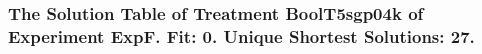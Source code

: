 \begin{frame}
 \fontsize{8pt}{9pt}\selectfont
 \frametitle{ The Solution Table of Treatment BoolT5sgp04k of Experiment ExpF. Fit: 0. Unique Shortest Solutions: 27. }

 \label{ExpFSolutionTable002.tex}  
 \end{frame}

